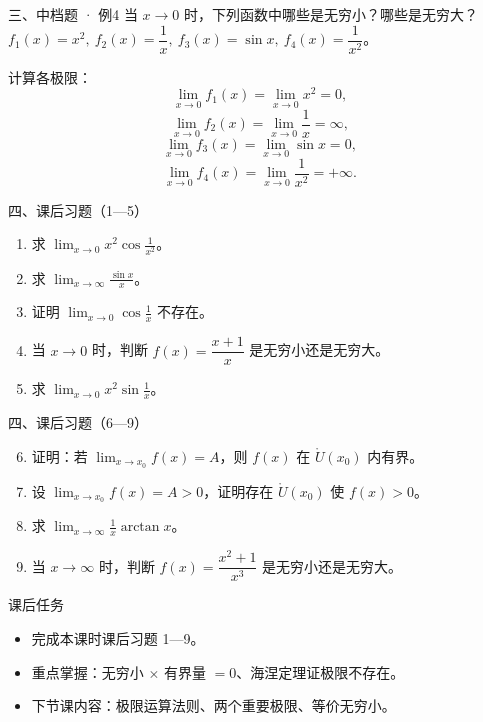 \documentclass[aspectratio=169,11pt]{beamer}
\begin{document}
\begin{frame}{三、中档题 · 例4}
 当 $x\to 0$ 时，下列函数中哪些是无穷小？哪些是无穷大？
$f_1(x)=x^2,\ f_2(x)=\dfrac1x,\ f_3(x)=\sin x,\ f_4(x)=\dfrac{1}{x^2}$。

 计算各极限：
\[
\lim_{x\to 0}f_1(x)=\lim_{x\to 0}x^2=0,
\]
\[
\lim_{x\to 0}f_2(x)=\lim_{x\to 0}\frac1x=\infty,
\]
\[
\lim_{x\to 0}f_3(x)=\lim_{x\to 0}\sin x=0,
\]
\[
\lim_{x\to 0}f_4(x)=\lim_{x\to 0}\frac1{x^2}=+\infty.
\]


\end{frame}

\begin{frame}{四、课后习题（1—5）}
\begin{enumerate}
  \item 求 $\displaystyle\lim_{x\to 0}x^2\cos\frac1{x^2}$。
  \item 求 $\displaystyle\lim_{x\to\infty}\frac{\sin x}{x}$。
  \item 证明 $\displaystyle\lim_{x\to 0}\cos\frac1x$ 不存在。
  \item 当 $x\to 0$ 时，判断 $f(x)=\dfrac{x+1}{x}$ 是无穷小还是无穷大。
  \item 求 $\displaystyle\lim_{x\to 0}x^2\sin\frac1x$。
\end{enumerate}
\end{frame}

\begin{frame}{四、课后习题（6—9）}
\begin{enumerate}\setcounter{enumi}{5}
  \item 证明：若 $\displaystyle\lim_{x\to x_0}f(x)=A$，则 $f(x)$ 在 $\mathring{U}(x_0)$ 内有界。
  \item 设 $\displaystyle\lim_{x\to x_0}f(x)=A>0$，证明存在 $\mathring{U}(x_0)$ 使 $f(x)>0$。
  \item 求 $\displaystyle\lim_{x\to\infty}\frac{1}{x}\arctan x$。
  \item 当 $x\to\infty$ 时，判断 $f(x)=\dfrac{x^2+1}{x^3}$ 是无穷小还是无穷大。
\end{enumerate}
\end{frame}

\begin{frame}{课后任务}
\begin{itemize}
  \item 完成本课时课后习题 1—9。
  \item 重点掌握：无穷小 $\times$ 有界量 $=0$、海涅定理证极限不存在。
  \item 下节课内容：极限运算法则、两个重要极限、等价无穷小。
\end{itemize}
\end{frame}
\end{document}
